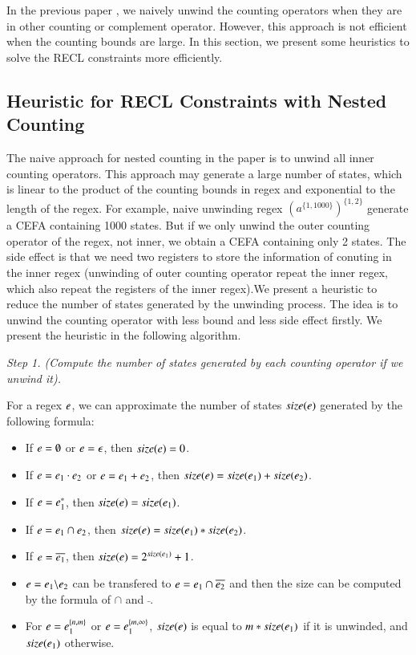 In the previous paper \cite{Denghang2023}, we naively unwind the counting operators when they are in other counting or complement operator. However, this approach is not efficient when the counting bounds are large. In this section, we present some heuristics to solve the RECL constraints more efficiently.

\subsection{Heuristic for RECL Constraints with Nested Counting}\label{heuristic:nested}
 The naive approach for nested counting in the paper \cite{Denghang2023} is to unwind all inner counting operators. This approach may generate a large number of states, which is linear to the product of the counting bounds in regex and exponential to the length of the regex. For example, naive unwinding regex $(a^{\{1,1000\}})^{\{1,2\}}$ generate a CEFA containing 1000 states. But if we only unwind the outer counting operator of the regex, not inner, we obtain a CEFA containing only 2 states. The side effect is that we need two registers to store the information of conuting in the inner regex (unwinding of outer counting operator repeat the inner regex, which also repeat the registers of the inner regex).We present a heuristic to reduce the number of states generated by the unwinding process. The idea is to unwind the counting operator with less bound and less side effect firstly. We present the heuristic in the following algorithm.

\medskip
\noindent
\emph{Step 1. (Compute the number of states generated by each counting operator if we unwind it).}

For a regex $e$, we can approximate the number of states $size(e)$ generated by the following formula: 
\begin{itemize}
  \item If $e = \emptyset$ or $e = \epsilon$, then $size(e) = 0$. 
  \item If $e = e_1 \cdot e_2$ or $e = e_1 + e_2$, then $size(e) = size(e_1) + size(e_2)$.
  \item If $e = e_1^*$, then $size(e) = size(e_1)$.
  \item If $e = e_1 \cap e_2$, then $size(e) = size(e_1)*size(e_2)$.
  \item If $e = \overline{e_1}$, then $size(e) = 2^{size(e_1)} + 1$.
  \item $e = e_1 \backslash e_2$ can be transfered to $e = e_1 \cap \overline{e_2}$ and then the size can be computed by the formula of $\cap$ and $\bar{}$.
  \item For $e = e_1^{\{n,m\}}$ or $e = e_1^{\{m,\infty\}}$, $size(e)$ is equal to $m*size(e_1)$ if it is unwinded, and $size(e_1)$ otherwise.
\end{itemize}

